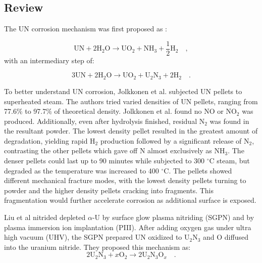 \documentclass[11pt]{article}
\begin{document}
\begin{multicols}{2}
\section{Review}


\par 
The UN corrosion mechanism was first proposed as \cite{Dell1967,Sugihara1969}:

\begin{equation}
\mbox{UN} + 2\mbox{H}_{2}\mbox{O} \rightarrow \mbox{UO}_{2} + \mbox{NH}_{3} + \frac{1}{2} \mbox{H}_{2} \quad ,
\end{equation}
with an intermediary step of: 

\begin{equation}
3\mbox{UN}+2\mbox{H}_{2}\mbox{O} \rightarrow \mbox{UO}_{2}+\mbox{U}_{2}\mbox{N}_{3}+2\mbox{H}_{2} \quad .
\end{equation}

To better understand UN corrosion, Jolkkonen et al. \cite{Jolkkonen2017} subjected UN pellets to superheated steam. The authors tried varied densities of UN pellets, ranging from 77.6\% to 97.7\% of theoretical density. Jolkkonen et al. found no NO or NO$_{2}$ was produced. Additionally, even after hydrolysis finished, residual N$_{2}$ was found in the resultant powder. The lowest density pellet resulted in the greatest amount of degradation, yielding rapid H$_{2}$ production followed by a significant release of N$_{2}$, contrasting the other pellets which gave off N almost exclusively as NH$_{3}$. The denser pellets could last up to 90 minutes while subjected to 300 $^{\circ}$C steam, but degraded as the temperature was increased to 400 $^{\circ}$C. The pellets showed different mechanical fracture modes, with the lowest density pellets turning to powder and the higher density pellets cracking into fragments. This fragmentation would further accelerate corrosion as additional surface is exposed.
\par 

Liu et al \cite{Liu2013} nitrided depleted $\alpha$-U by surface glow plasma nitriding (SGPN) and by plasma immersion ion implantation (PIII). After adding oxygen gas under ultra high vacuum (UHV), the SGPN prepared UN oxidized to U$_{2}$N$_{3}$ and O diffused into the uranium nitride. They proposed this mechanism as:
\begin{equation}
2\mbox{U}_{2}\mbox{N}_{3} +x \mbox{O}_{2} \rightarrow 2\mbox{U}_{2}\mbox{N}_{3}\mbox{O}_{x} \quad .
\end{equation}


\end{multicols}
\end{document}
